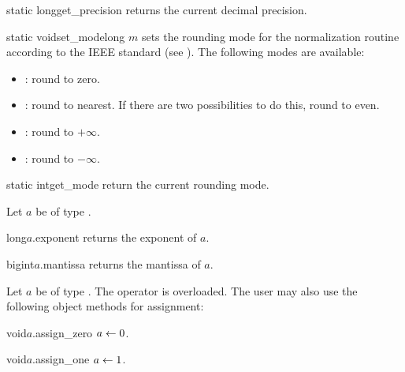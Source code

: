 \begin{fcode}{static long}{get_precision}{}
  returns the current decimal precision.
\end{fcode}

\begin{fcode}{static void}{set_mode}{long $m$}
  sets the rounding mode for the normalization routine according to the IEEE standard (see
  \cite{IEEE:754}).  The following modes are available:
  \begin{itemize}
  \item {}: round to zero.
  \item {}: round to nearest.  If there are two possibilities to do this, round to
    even.
  \item {}: round to $+\infty$.
  \item {}: round to $-\infty$.
  \end{itemize}
\end{fcode}

\begin{fcode}{static int}{get_mode}{}
  return the current rounding mode.
\end{fcode}



\ACCS

Let $a$ be of type .

\begin{fcode}{long}{$a$.exponent}{}
  returns the exponent of $a$.
\end{fcode}

\begin{fcode}{bigint}{$a$.mantissa}{}
  returns the mantissa of $a$.
\end{fcode}



\ASGN

Let $a$ be of type .  The operator \code{=} is overloaded.  The user may also use
the following object methods for assignment:

\begin{fcode}{void}{$a$.assign_zero}{}
  $a \leftarrow 0$.
\end{fcode}

\begin{fcode}{void}{$a$.assign_one}{}
  $a \leftarrow 1$.
\end{fcode}

